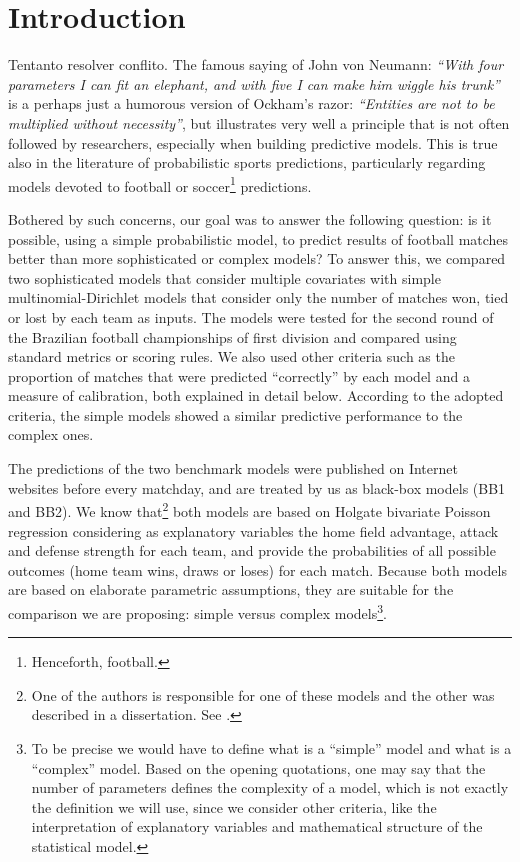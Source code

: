 \documentclass[journal,article,accept,moreauthors,pdftex,12pt,a4paper]{mdpi}
\begin{document}
	
	
	\section{Introduction}
	
	Tentanto resolver conflito.
	The famous saying of John von Neumann: {\it ``With four parameters I can fit an elephant, and with five I can make him wiggle his trunk''} is a perhaps just a humorous version of Ockham's razor:
	{\it``Entities are not to be multiplied without necessity''}, but illustrates very well a principle that is not often followed by researchers, especially when building predictive models.
	This is true also in the literature of probabilistic sports predictions, particularly regarding models devoted to football or soccer\footnote{Henceforth, football.} predictions.
	
	Bothered by such concerns, our goal was to answer the following question: is it possible, using a simple probabilistic model, to predict results of football matches better than more sophisticated or complex models?
	To answer this, we compared two sophisticated models that consider multiple covariates with simple multinomial-Dirichlet models that consider only the number of matches won, tied or lost by each team as inputs.
	The models were tested for the second round of the Brazilian football championships of first division and compared using standard metrics or scoring rules.
	We also used other criteria such as the proportion of matches that were predicted ``correctly'' by each model and a measure of calibration, both explained in detail below.
	According to the adopted criteria, the simple models showed a similar predictive performance to the complex ones.
	
	The predictions of the two benchmark models were published on Internet websites before every matchday, and are treated by us as black-box models (BB1 and BB2). 
	We know that\footnote{One of the authors is responsible for one of these models and the other was described in a dissertation. See \cite{arruda2000}.} both models are based on Holgate bivariate Poisson regression considering as explanatory variables the home field advantage, attack and defense strength for each team, and provide the probabilities of all possible outcomes (home team wins, draws or loses) for each match.
	Because both models are based on elaborate parametric assumptions, they are suitable for the comparison we are proposing: simple versus complex models\footnote{To be precise we would have to define what is a ``simple'' model and what is a ``complex'' model. Based on the opening quotations, one may say that the number of parameters defines the complexity of a model, which is not exactly the definition we will use, since we consider other criteria, like the interpretation of explanatory variables and mathematical structure of the statistical model.}.
	
\end{document}
